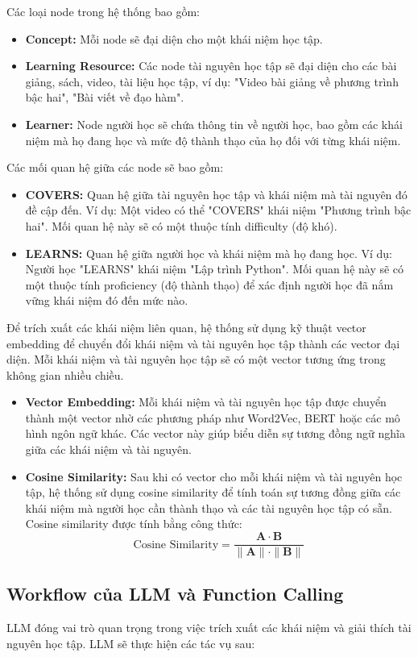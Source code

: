 Các loại node trong hệ thống bao gồm:
\begin{itemize}
    \item \textbf{Concept:}  Mỗi node sẽ đại diện cho một khái niệm học tập.
    \item \textbf{Learning Resource:} Các node tài nguyên học tập sẽ đại diện cho các bài giảng, sách, video, tài liệu học tập, ví dụ: "Video bài giảng về phương trình bậc hai", "Bài viết về đạo hàm".
    \item \textbf{Learner:} Node người học sẽ chứa thông tin về người học, bao gồm các khái niệm mà họ đang học và mức độ thành thạo của họ đối với từng khái niệm.
\end{itemize}
Các mối quan hệ giữa các node sẽ bao gồm:
\begin{itemize}
    \item \textbf{COVERS:} Quan hệ giữa tài nguyên học tập và khái niệm mà tài nguyên đó đề cập đến. Ví dụ: Một video có thể "COVERS" khái niệm "Phương trình bậc hai". Mối quan hệ này sẽ có một thuộc tính difficulty (độ khó).
    \item \textbf{LEARNS:}  Quan hệ giữa người học và khái niệm mà họ đang học. Ví dụ: Người học "LEARNS" khái niệm "Lập trình Python". Mối quan hệ này sẽ có một thuộc tính proficiency (độ thành thạo) để xác định người học đã nắm vững khái niệm đó đến mức nào.
\end{itemize}
Để trích xuất các khái niệm liên quan, hệ thống sử dụng kỹ thuật vector embedding để chuyển đổi khái niệm và tài nguyên học tập thành các vector đại diện. Mỗi khái niệm và tài nguyên học tập sẽ có một vector tương ứng trong không gian nhiều chiều.
\begin{itemize}
    \item \textbf{Vector Embedding:}  Mỗi khái niệm và tài nguyên học tập được chuyển thành một vector nhờ các phương pháp như Word2Vec, BERT hoặc các mô hình ngôn ngữ khác. Các vector này giúp biểu diễn sự tương đồng ngữ nghĩa giữa các khái niệm và tài nguyên.
    \item \textbf{Cosine Similarity:} Sau khi có vector cho mỗi khái niệm và tài nguyên học tập, hệ thống sử dụng cosine similarity để tính toán sự tương đồng giữa các khái niệm mà người học cần thành thạo và các tài nguyên học tập có sẵn. Cosine similarity được tính bằng công thức:
$$
\text{Cosine Similarity} = \frac{\mathbf{A} \cdot \mathbf{B}}{\|\mathbf{A}\| \cdot \|\mathbf{B}\|}
$$

\end{itemize}
\subsection{Workflow của LLM và Function Calling}
LLM đóng vai trò quan trọng trong việc trích xuất các khái niệm và giải thích tài nguyên học tập. LLM sẽ thực hiện các tác vụ sau:
